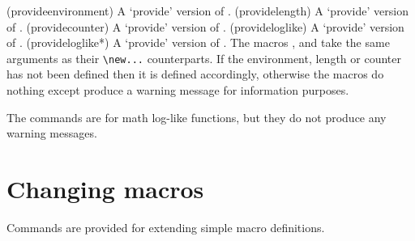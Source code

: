 \begin{syntax}
\cmd{\provideenvironment} \\
\cmd{\providelength} \\
\cmd{\providecounter} \\
\cmd{\provideloglike} \\
\cmd{\provideloglike*} \\
\end{syntax}
\glossary(provideenvironment)%
  {}%
  {A `provide' version of .}
\glossary(providelength)%
  {}%
  {A `provide' version of .}
\glossary(providecounter)%
  {}%
  {A `provide' version of .}
\glossary(provideloglike)%
  {}%
  {A `provide' version of .}
\glossary(provideloglike*)%
  {}%
  {A `provide' version of .}
    The macros \cmd{\provideenvironment}, \cmd{\providelength}
and \cmd{\providecounter} take the same arguments as their \verb?\new...?
counterparts. If the environment, length or counter has not been defined
then it is defined accordingly, otherwise the macros do nothing except
produce a warning message for information purposes.

   The \cmd{\provideloglike} commands are for math log-like functions,
but they do not produce any warning messages.

\section{Changing macros} \label{sec:addtodef}

     Commands are provided for extending simple macro 
definitions.

